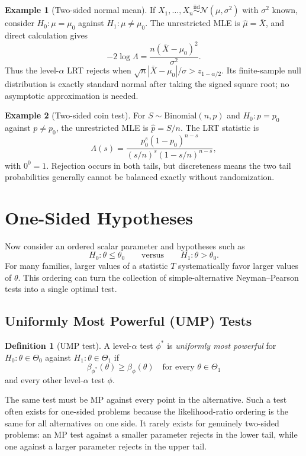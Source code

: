 \documentclass[12pt,oneside]{book}
\numberwithin{equation}{section}
\theoremstyle{definition}
\newtheorem{definition}{Definition}[section]
\newtheorem{example}{Example}[section]
\theoremstyle{plain}
\theoremstyle{remark}
\newcommand{\iid}{\overset{\text{iid}}{\sim}}
\newcommand{\abs}[1]{\left\lvert #1 \right\rvert}
\newcommand{\Normal}{\mathcal{N}}
\newcommand{\Bin}{\mathrm{Binomial}}
\begin{document}
\begin{example}[Two-sided normal mean]
If $X_1,\ldots,X_n\iid\Normal(\mu,\sigma^2)$ with $\sigma^2$ known, consider
$H_0:\mu=\mu_0$ against $H_1:\mu\neq\mu_0$.  The unrestricted MLE is
$\widehat\mu=\bar X$, and direct calculation gives
\[
    -2\log\Lambda
    =\frac{n(\bar X-\mu_0)^2}{\sigma^2}.
\]
Thus the level-$\alpha$ LRT rejects when
$\sqrt n\abs{\bar X-\mu_0}/\sigma>z_{1-\alpha/2}$.  Its finite-sample null
distribution is exactly standard normal after taking the signed square root;
no asymptotic approximation is needed.
\end{example}

\begin{example}[Two-sided coin test]
For $S\sim\Bin(n,p)$ and $H_0:p=p_0$ against $p\neq p_0$, the unrestricted
MLE is $\widehat p=S/n$.  The LRT statistic is
\[
 \Lambda(s)=
 \frac{p_0^s(1-p_0)^{n-s}}
      {(s/n)^s(1-s/n)^{n-s}},
\]
with $0^0=1$.  Rejection occurs in both tails, but discreteness means the two
tail probabilities generally cannot be balanced exactly without
randomization.
\end{example}

\section{One-Sided Hypotheses}

Now consider an ordered scalar parameter and hypotheses such as
\[
    H_0:\theta\leq\theta_0
    \qquad\text{versus}\qquad
    H_1:\theta>\theta_0.
\]
For many families, larger values of a statistic $T$ systematically favor
larger values of $\theta$.  This ordering can turn the collection of
simple-alternative Neyman--Pearson tests into a single optimal test.

\subsection{Uniformly Most Powerful (UMP) Tests}

\begin{definition}[UMP test]
A level-$\alpha$ test $\phi^*$ is \emph{uniformly most powerful} for
$H_0:\theta\in\Theta_0$ against $H_1:\theta\in\Theta_1$ if
\[
    \beta_{\phi^*}(\theta)\geq\beta_\phi(\theta)
    \quad\text{for every }\theta\in\Theta_1
\]
and every other level-$\alpha$ test $\phi$.
\end{definition}

The same test must be MP against every point in the alternative.  Such a test
often exists for one-sided problems because the likelihood-ratio ordering is
the same for all alternatives on one side.  It rarely exists for genuinely
two-sided problems: an MP test against a smaller parameter rejects in the
lower tail, while one against a larger parameter rejects in the upper tail.
\end{document}

